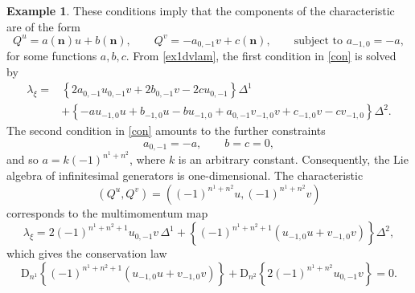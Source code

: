 \documentclass[11pt]{article} %
\numberwithin{equation}{section}
\newcommand{\diff}[1]{\mathrm{D}_{n^{#1}}}
\newcommand{\mbn}{\mathbf{n}}
\theoremstyle{plain}
\theoremstyle{definition}
\newtheorem{exm}[defn]{Example}
\begin{document}
\begin{exm}
These conditions imply that the components of the characteristic are of the form
\begin{equation}
    Q^u=a(\mbn)u+b(\mbn),\qquad Q^v=-a_{0,-1}v+c(\mbn),\qquad \text{subject to } a_{-1,0}=-a,
\end{equation}
for some functions $a,b,c$. From
\eqref{ex1dvlam}, the first condition in \eqref{con} is solved by
\begin{equation}
\begin{aligned}
    \lambda_\xi=&\left\{2a_{0,-1}u_{0,-1}v+2b_{0,-1}v-2cu_{0,-1}\right\}\Delta^1\\&+\left\{-au_{-1,0}u+b_{-1,0}u-bu_{-1,0}+a_{0,-1}v_{-1,0}v+c_{-1,0}v-cv_{-1,0}\right\}\Delta^2.
    \end{aligned}
\end{equation}
The second condition in \eqref{con} amounts to the further constraints
\begin{equation}
    a_{0,-1}=-a,\qquad b=c=0,
\end{equation}
and so $a=k(-1)^{n^1+n^2}$, where $k$ is an arbitrary constant. Consequently, the Lie algebra of infinitesimal generators is one-dimensional. The characteristic
\begin{equation}
\left(Q^u,Q^v\right)=\left((-1)^{n^1+n^2}u,(-1)^{n^1+n^2}v\right)    
\end{equation}
corresponds to the multimomentum map
\begin{equation}
    \lambda_\xi=2(-1)^{n^1+n^2+1}u_{0,-1}v\,\Delta^1+\left\{(-1)^{n^1+n^2+1}\left(u_{-1,0}u+v_{-1,0}v\right)\right\}\Delta^2,
\end{equation}
which gives the conservation law
\begin{equation}
    \diff{1}\!\left\{(-1)^{n^1+n^2+1}\left(u_{-1,0}u+v_{-1,0}v\right)\right\}+\diff{2}\!\left\{2(-1)^{n^1+n^2}u_{0,-1}v\right\}=0.
\end{equation}
\end{exm}
    
\end{document}

